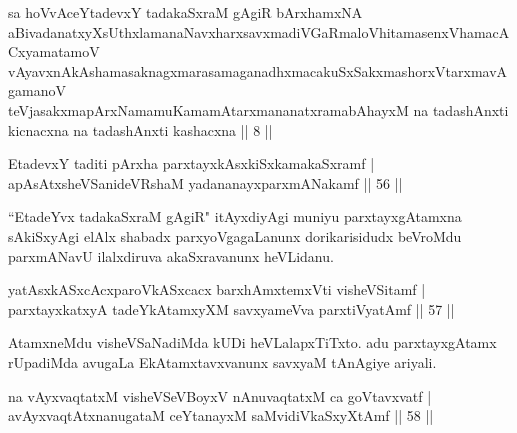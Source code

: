 
\begin{kandikeshl}
sa hoVvAceYtadevxY tadakaSxraM gAgiR bArxhamxNA aBivadanatxyXsUthxlamanaNavxharxsavxmadiVGaRmaloVhitamasenxVhamacACxyamatamoV\s \\ vAyavxnAkAshamasaknagxmarasamaganadhxmacakuSxSakxmashorxVtarxmavAgamanoV\s\\ teVjasakxmapArxNamamuKamamAtarxmananatxramabAhayxM na tadashAnxti kicnacxna na tadashAnxti kashacxna || 8 ||
\end{kandikeshl}

\begin{shl}
EtadevxY taditi pArxha parxtayxkAsxkiSxkamakaSxramf |\\
apAsAtxsheVSanideVRshaM yadananayxparxmANakamf \hfill || 56 ||
\end{shl}

\begin{artha}
``EtadeYvx tadakaSxraM gAgiR" itAyxdiyAgi muniyu parxtayxgAtamxna sAkiSxyAgi elAlx shabadx parxyoVgagaLanunx dorikarisidudx beVroMdu parxmANavU ilalxdiruva akaSxravanunx heVLidanu.
\end{artha}

\begin{shl}
yatAsxkASxcAcxparoVkASxcacx barxhAmxtemxVti visheVSitamf |\\
parxtayxkatxyA tadeYkAtamxyXM savxyameVva parxtiVyatAmf \hfill || 57 ||
\end{shl}

\begin{artha}
AtamxneMdu visheVSaNadiMda kUDi heVLalapxTiTxto. adu parxtayxgAtamx rUpadiMda avugaLa EkAtamxtavxvanunx savxyaM tAnAgiye ariyali.
\end{artha}%



\begin{shl}
na vAyxvaqtatxM visheVSeVBoyxV nAnuvaqtatxM ca goVtavxvatf |\\
avAyxvaqtAtxnanugataM ceYtanayxM saMvidiVkaSxyXtAmf \hfill || 58 ||
\end{shl}

